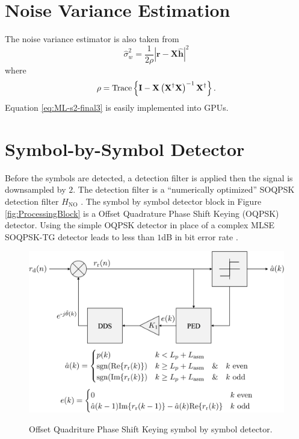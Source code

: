 \section{Noise Variance Estimation}
\label{sec:noise_variance_estimation}
The noise variance estimator is also taken from \cite[eq. 9]{rice-afran-saquib-cole-rhodes-moazzami:2014}
\begin{equation}
	\hat{\sigma}_w^2 = \frac{1}{2\rho} \left| \mathbf{r}-\mathbf{X}\hat{\mathbf{h}}\right|^2
	\label{eq:ML-s2-final3}
\end{equation}
where
\begin{equation}
	\rho = {\rm Trace} \left\{ \mathbf{I} -  \mathbf{X}\left(\mathbf{X}^\dag\mathbf{X}\right)^{-1}\mathbf{X}^\dag \right\}.
\end{equation}
Equation \eqref{eq:ML-s2-final3} is easily implemented into GPUs.


\section{Symbol-by-Symbol Detector}
\label{sec:oqpsk_detector}
Before the symbols are detected, a detection filter is applied then the signal is downsampled by $2$. 
The detection filter is a ``numerically optimized'' SOQPSK detection filter $H_\text{NO}$ \cite[Fig. 3]{perrins:2013}.
The symbol by symbol detector block in Figure \ref{fig:ProcessingBlock} is a Offset Quadrature Phase Shift Keying (OQPSK) detector.
Using the simple OQPSK detector in place of a complex MLSE SOQPSK-TG detector leads to less than $1$dB in bit error rate \cite{perrins:2013}.
\begin{figure}
	\centering\includegraphics[width=6in]{figures/systemOverview/OQPSK.pdf}
	\label{fig:OQPSK}
	\caption{Offset Quadriture Phase Shift Keying symbol by symbol detector.}
\end{figure}

